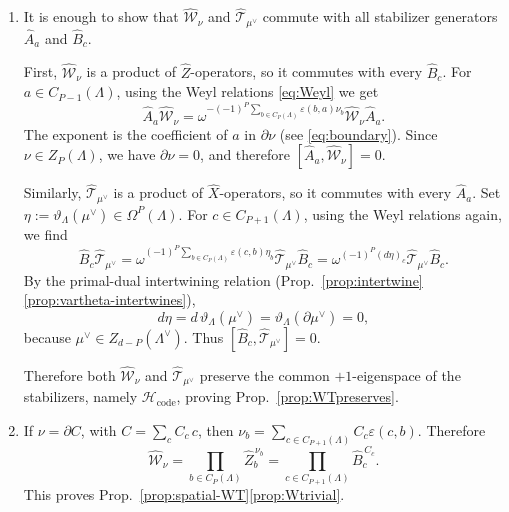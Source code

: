 \documentclass[dvipsnames,a4paper]{article}
\numberwithin{equation}{section}
\theoremstyle{definition}
\theoremstyle{remark}
\begin{document}
\begin{enumerate}
	\item It is enough to show that \(\hat{\mathcal W}_\nu\) and
	\(\hat{\mathcal T}_{\mu^\vee}\) commute with all stabilizer generators
	\(\hat A_a\) and \(\hat B_c\).
	
	First, \(\hat{\mathcal W}_\nu\) is a product of \(\hat Z\)-operators, so it commutes
	with every \(\hat B_c\). For \(a\in C_{P-1}(\Lambda)\), using the Weyl relations \eqref{eq:Weyl} we get
	\begin{equation}
		\hat A_a\hat{\mathcal W}_\nu
		=
		\omega^{-(-1)^P\sum_{b\in C_P(\Lambda)}
			\varepsilon(b,a)\nu_b}
		\hat{\mathcal W}_\nu\hat A_a .
	\end{equation}
	The exponent is the coefficient of \(a\) in \(\partial\nu\) (see \eqref{eq:boundary}). Since
	\(\nu\in Z_P(\Lambda)\), we have \(\partial\nu=0\), and therefore $[\hat A_a,\hat{\mathcal W}_\nu]=0$.
	
	Similarly, \(\hat{\mathcal T}_{\mu^\vee}\) is a product of \(\hat X\)-operators, so it
	commutes with every \(\hat A_a\). Set $\eta:=\vartheta_\Lambda(\mu^\vee)\in \Omega^P(\Lambda)$. For \(c\in C_{P+1}(\Lambda)\), using the Weyl relations again, we find
	\begin{equation}
		\hat B_c\hat{\mathcal T}_{\mu^\vee}
		=
		\omega^{(-1)^P\sum_{b\in C_P(\Lambda)}
			\varepsilon(c,b)\eta_b}
		\hat{\mathcal T}_{\mu^\vee}\hat B_c
		=
		\omega^{(-1)^P(d\eta)_c}
		\hat{\mathcal T}_{\mu^\vee}\hat B_c .
	\end{equation}
	By the primal-dual intertwining relation (Prop.~\ref{prop:intertwine}\ref{prop:vartheta-intertwines}),
	\begin{equation}
		d\eta
		=
		d\,\vartheta_\Lambda(\mu^\vee)
		=
		\vartheta_\Lambda(\partial\mu^\vee)
		=
		0,
	\end{equation}
	because \(\mu^\vee\in Z_{d-P}(\Lambda^\vee)\). Thus $[\hat B_c,\hat{\mathcal T}_{\mu^\vee}]=0$.
	
	Therefore both \(\hat{\mathcal W}_\nu\) and \(\hat{\mathcal T}_{\mu^\vee}\) preserve the
	common \(+1\)-eigenspace of the stabilizers, namely
	\(\mathcal H_{\mathrm{code}}\), proving Prop.~\ref{prop:WTpreserves}.
	
	\item If \(\nu=\partial C\), with \(C=\sum_c C_c\,c\), then
	$
	\nu_b
	=
	\sum_{c\in C_{P+1}(\Lambda)}C_c\varepsilon(c,b)
	$.
	Therefore
	\begin{equation}
		\hat{\mathcal W}_\nu
		=
		\prod_{b\in C_P(\Lambda)}\hat Z_b^{\,\nu_b}
		=
		\prod_{c\in C_{P+1}(\Lambda)}\hat B_c^{\,C_c}.
	\end{equation}
	This proves Prop.~\ref{prop:spatial-WT}\ref{prop:Wtrivial}.
	

\end{enumerate}
\end{document}
